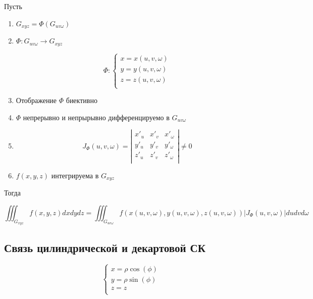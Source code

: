 \documentclass[a4paper, 14pt]{report}
\begin{document}
    \begin{theorem}
        Пусть

        \begin{enumerate}
            \item $G_{xyz} = \Phi(G_{uv\omega})$
            \item $\Phi: G_{uv\omega} \to G_{xyz}$

                $$
                \Phi : 
                \begin{cases}
                    x = x(u, v, \omega) \\
                    y = y(u, v, \omega) \\
                    z = z(u, v, \omega) \\
                \end{cases}
                $$

            \item Отображение $\Phi$ биективно
            \item $\Phi$ непрерывно и непрырывно дифференцируемо в $G_{uv\omega}$
            \item 
                $$
                J_\Phi(u,v,\omega) = \left|
                \begin{matrix}
                    x'_u & x'_v & x'_\omega \\
                    y'_u & y'_v & y'_\omega \\
                    z'_u & z'_v & z'_\omega \\
                \end{matrix}
                \right| \ne 0
                $$
            \item $f(x,y,z)$ интегрируема в $G_{xyz}$
        \end{enumerate}

        Тогда

        $$
        \iiint_{G_{xyz}} f(x,y,z)dxdydz = \iiint_{G_{uv\omega}} f(x(u,v,\omega), y(u,v,\omega), z(u,v,\omega)) |J_\Phi(u,v,\omega)| dudvd\omega
        $$
    \end{theorem}

    \subsection{Связь цилиндрической и декартовой СК}

    $$
    \begin{cases}
        x = \rho \cos(\phi) \\
        y = \rho \sin(\phi) \\
        z = z \\
    \end{cases}
    $$
\end{document}
